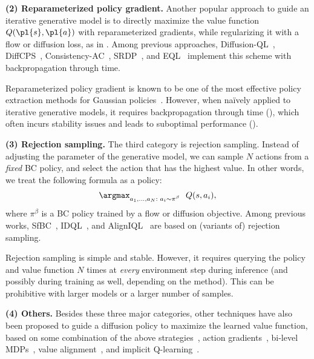 %
%
%


\textbf{(2) Reparameterized policy gradient.}
Another popular approach to guide an iterative generative model is
to directly maximize the value function $Q(\pl{s}, \pl{a})$ with reparameterized gradients,
while regularizing it with a flow or diffusion loss,
as in .
Among previous approaches,
Diffusion-QL~\citep{dql_wang2023},
DiffCPS~\citep{diffcps_he2023},
Consistency-AC~\citep{consistencyac_ding2024},
SRDP~\citep{srdp_ada2024},
and EQL~\citep{entropydql_zhang2024}
implement this scheme with backpropagation through time.

Reparameterized policy gradient is known to be one of the most effective policy extraction methods for Gaussian policies~\citep{bottleneck_park2024}.
However, when na\"ively applied to iterative generative models,
it requires backpropagation through time (),
which often incurs stability issues %
and leads to suboptimal performance ().

%
%
%
%
%
%
%
%
%
%
%
%
%
%
%
%
%
%
%
%
%

\textbf{(3) Rejection sampling.}
The third category is rejection sampling.
Instead of adjusting the parameter of the generative model,
we can sample $N$ actions from a \emph{fixed} BC policy, and select the action that has the highest value.
In other words, we treat the following formula as a policy:
\begin{align}
    \argmax_{\substack{a_1, \dots, a_N \text{$:$ } a_i \sim \pi^\beta}} \ \ Q(s, a_i), \label{eq:rejection}
\end{align}
where $\pi^\beta$ is a BC policy trained by a flow or diffusion objective.
Among previous works, 
SfBC~\citep{sfbc_chen2023},
IDQL~\citep{idql_hansenestruch2023},
and AlignIQL~\citep{aligniql_he2024}
are based on (variants of) rejection sampling.

Rejection sampling is simple and stable.
However, it requires querying the policy and value function $N$ times
at \emph{every} environment step during inference (and possibly during training as well, depending on the method).
This can be prohibitive with larger models or a larger number of samples.
%

%

%
%
%
%
%
%
%

\textbf{(4) Others.}
Besides these three major categories,
other techniques have also been proposed to guide a diffusion policy to maximize the learned value function,
based on some combination of the above strategies~\citep{diffusiondice_mao2024},
action gradients~\citep{dipo_yang2023, ddiffpg_li2024, parl_mark2024, dac_anonymous2025},
bi-level MDPs~\citep{dppo_ren2025},
value alignment~\citep{eda_chen2024},
and implicit Q-learning~\citep{srpo_chen2024, dtql_chen2024}.

